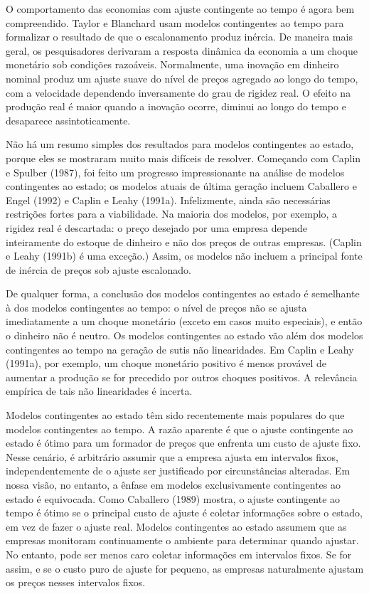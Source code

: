 \documentclass[12pt]{article}
\begin{document}
O comportamento das economias com ajuste contingente ao tempo é agora bem compreendido. Taylor e Blanchard usam modelos contingentes ao tempo para formalizar o resultado de que o escalonamento produz inércia. De maneira mais geral, os pesquisadores derivaram a resposta dinâmica da economia a um choque monetário sob condições razoáveis. Normalmente, uma inovação em dinheiro nominal produz um ajuste suave do nível de preços agregado ao longo do tempo, com a velocidade dependendo inversamente do grau de rigidez real. O efeito na produção real é maior quando a inovação ocorre, diminui ao longo do tempo e desaparece assintoticamente.

Não há um resumo simples dos resultados para modelos contingentes ao estado, porque eles se mostraram muito mais difíceis de resolver. Começando com Caplin e Spulber (1987), foi feito um progresso impressionante na análise de modelos contingentes ao estado; os modelos atuais de última geração incluem Caballero e Engel (1992) e Caplin e Leahy (1991a). Infelizmente, ainda são necessárias restrições fortes para a viabilidade. Na maioria dos modelos, por exemplo, a rigidez real é descartada: o preço desejado por uma empresa depende inteiramente do estoque de dinheiro e não dos preços de outras empresas. (Caplin e Leahy (1991b) é uma exceção.) Assim, os modelos não incluem a principal fonte de inércia de preços sob ajuste escalonado.

De qualquer forma, a conclusão dos modelos contingentes ao estado é semelhante à dos modelos contingentes ao tempo: o nível de preços não se ajusta imediatamente a um choque monetário (exceto em casos muito especiais), e então o dinheiro não é neutro. Os modelos contingentes ao estado vão além dos modelos contingentes ao tempo na geração de sutis não linearidades. Em Caplin e Leahy (1991a), por exemplo, um choque monetário positivo é menos provável de aumentar a produção se for precedido por outros choques positivos. A relevância empírica de tais não linearidades é incerta.

Modelos contingentes ao estado têm sido recentemente mais populares do que modelos contingentes ao tempo. A razão aparente é que o ajuste contingente ao estado é ótimo para um formador de preços que enfrenta um custo de ajuste fixo. Nesse cenário, é arbitrário assumir que a empresa ajusta em intervalos fixos, independentemente de o ajuste ser justificado por circunstâncias alteradas. Em nossa visão, no entanto, a ênfase em modelos exclusivamente contingentes ao estado é equivocada. Como Caballero (1989) mostra, o ajuste contingente ao tempo é ótimo se o principal custo de ajuste é coletar informações sobre o estado, em vez de fazer o ajuste real. Modelos contingentes ao estado assumem que as empresas monitoram continuamente o ambiente para determinar quando ajustar. No entanto, pode ser menos caro coletar informações em intervalos fixos. Se for assim, e se o custo puro de ajuste for pequeno, as empresas naturalmente ajustam os preços nesses intervalos fixos.
\end{document}
